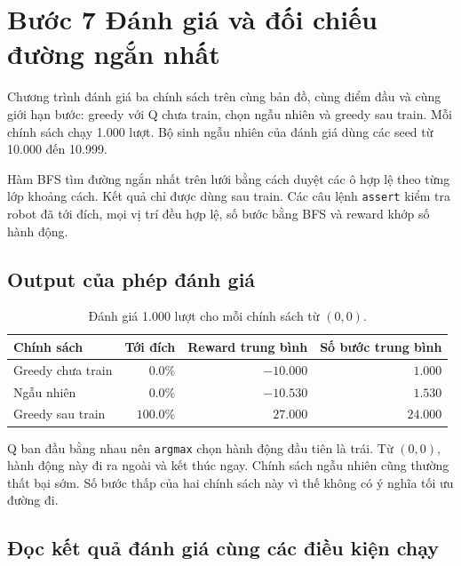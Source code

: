\clearpage
\section{Bước 7 Đánh giá và đối chiếu đường ngắn nhất}
Chương trình đánh giá ba chính sách trên cùng bản đồ, cùng điểm đầu và cùng giới hạn bước: greedy với Q chưa train, chọn ngẫu nhiên và greedy sau train. Mỗi chính sách chạy 1.000 lượt. Bộ sinh ngẫu nhiên của đánh giá dùng các seed từ 10.000 đến 10.999.


Hàm BFS tìm đường ngắn nhất trên lưới bằng cách duyệt các ô hợp lệ theo từng lớp khoảng cách. Kết quả chỉ được dùng sau train. Các câu lệnh \texttt{assert} kiểm tra robot đã tới đích, mọi vị trí đều hợp lệ, số bước bằng BFS và reward khớp số hành động.

\clearpage
\subsection{Output của phép đánh giá}

\begin{table}[H]\centering\small
\caption{Đánh giá 1.000 lượt cho mỗi chính sách từ $(0,0)$.}
\begin{tabular}{@{}lrrr@{}}\toprule
Chính sách & Tới đích & Reward trung bình & Số bước trung bình \\\midrule
Greedy chưa train & $0.0\%$ & $-10.000$ & $1.000$ \\
Ngẫu nhiên & $0.0\%$ & $-10.530$ & $1.530$ \\
Greedy sau train & $100.0\%$ & $27.000$ & $24.000$ \\\bottomrule
\end{tabular}
\end{table}

Q ban đầu bằng nhau nên \texttt{argmax} chọn hành động đầu tiên là trái. Từ $(0,0)$, hành động này đi ra ngoài và kết thúc ngay. Chính sách ngẫu nhiên cũng thường thất bại sớm. Số bước thấp của hai chính sách này vì thế không có ý nghĩa tối ưu đường đi.

\clearpage
\subsection{Đọc kết quả đánh giá cùng các điều kiện chạy}

